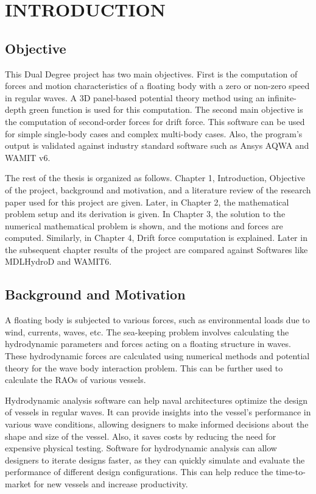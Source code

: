 \chapter{INTRODUCTION}

\section{Objective}
This Dual Degree project has two main objectives. First is the computation of forces and motion characteristics of a floating body with a zero or non-zero speed in regular waves. A 3D panel-based potential theory method using an infinite-depth green function is used for this computation. The second main objective is the computation of second-order forces for drift force. This software can be used for simple single-body cases and complex multi-body cases. Also, the program's output is validated against industry standard software such as Ansys AQWA and WAMIT v6.

The rest of the thesis is organized as follows. Chapter 1, Introduction, Objective of the project, background and motivation, and a literature review of the research paper used for this project are given. Later, in Chapter 2, the mathematical problem setup and its derivation is given. In Chapter 3, the solution to the numerical mathematical problem is shown, and the motions and forces are computed. Similarly, in Chapter 4, Drift force computation is explained. Later in the subsequent chapter results of the project are compared against Softwares like MDLHydroD and WAMIT6.


\section{Background and Motivation}
A floating body is subjected to various forces, such as environmental loads due to wind, currents, waves, etc. The sea-keeping problem involves calculating the hydrodynamic parameters and forces acting on a floating structure in waves. These hydrodynamic forces are calculated using numerical methods and potential theory for the wave body interaction problem. This can be further used to calculate the RAOs of various vessels.

Hydrodynamic analysis software can help naval architectures optimize the design of vessels in regular waves. It can provide insights into the vessel's performance in various wave conditions, allowing designers to make informed decisions about the shape and size of the vessel. Also, it saves costs by reducing the need for expensive physical testing.
Software for hydrodynamic analysis can allow designers to iterate designs faster, as they can quickly simulate and evaluate the performance of different design configurations. This can help reduce the time-to-market for new vessels and increase productivity.

